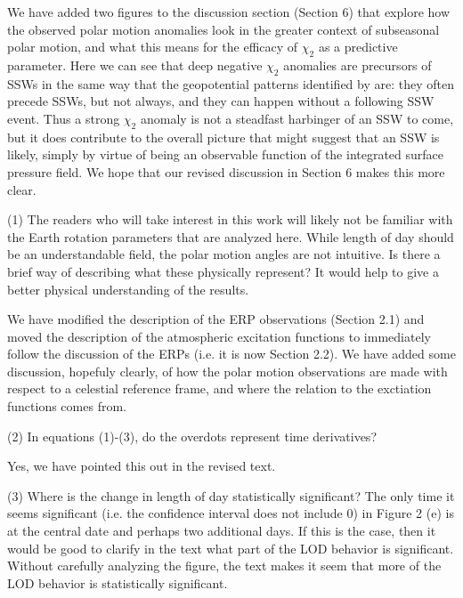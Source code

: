 \documentclass[a4paper,10pt]{article}
\begin{document}
We have added two figures to the discussion section (Section 6) that explore how the observed polar motion anomalies look in the greater context of subseasonal polar motion, and what this means for the efficacy of $\chi_2$ as a predictive parameter.
Here we can see that deep negative $\chi_2$ anomalies are precursors of SSWs in the same way that the geopotential patterns identified by \citet{Garfinkel2010} are: they often precede SSWs, but not always, and they can happen without a following SSW event. 
Thus a strong $\chi_2$ anomaly is not a steadfast harbinger of an SSW to come, but it does contribute to the overall picture that might suggest that an SSW is likely, simply by virtue of being an observable function of the integrated surface pressure field.
We hope that our revised discussion in Section 6 makes this more clear.
\vspace{0.5cm}


\noindent \textcolor{reviewer}{(1) The readers who will take interest in this work will likely not be familiar with the Earth rotation parameters that are analyzed here. While length of day should be an understandable field, the polar motion angles are not intuitive. Is there a brief way of describing what these physically represent? It would help to give a better physical understanding of the results.}
\vspace{0.5cm}

We have modified the description of the ERP observations (Section 2.1) and moved the description of the atmospheric excitation functions to immediately follow the discussion of the ERPs (i.e. it is now Section 2.2).
We have added some discussion, hopefuly  clearly, of how the polar motion observations are made with respect to a celestial reference frame, and where the relation to the exctiation functions comes from.  
\vspace{0.5cm}

\noindent \textcolor{reviewer}{(2) In equations (1)-(3), do the overdots represent time derivatives?}
\vspace{0.5cm}

Yes, we have pointed this out in the revised text.
\vspace{0.5cm}


\noindent \textcolor{reviewer}{(3) Where is the change in length of day statistically significant? The only time it seems significant (i.e. the confidence interval does not include 0) in Figure 2 (e) is at the central date and perhaps two additional days. If this is the case, then it would be good to clarify in the text what part of the LOD behavior is significant. Without carefully analyzing the figure, the text makes it seem that more of the LOD behavior is statistically significant.}
\vspace{0.5cm}
\end{document}
